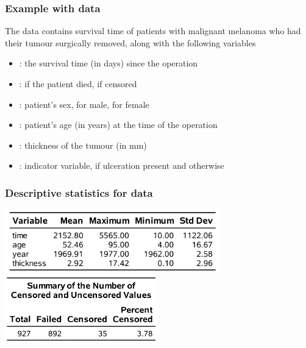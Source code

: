 \documentclass{beamer}
\begin{document}
\begin{frame}
\frametitle{Example with  data}
The  data contains survival time of patients with malignant melanoma who had their tumour surgically removed, along with the following variables


{ \footnotesize
\begin{itemize}
\itemsep0em 
\item {}: the survival time (in days) since the operation
\item {}:  if the patient died,  if censored
\item {}: patient's sex,  for male,  for female
\item {}: patient's age (in years) at the time of the operation
\item {}: thickness  of the tumour (in mm)
\item {}: indicator variable,  if ulceration present and  otherwise
\end{itemize}
}

\end{frame}

\begin{frame}
\frametitle{Descriptive statistics for   data}
\begin{center}
\includegraphics[width = 0.7\textwidth]{img/c7/slides7e10}
\includegraphics[width = 0.5\textwidth]{img/c7/slides7e09}
\end{center}
\end{frame}
\end{document}
